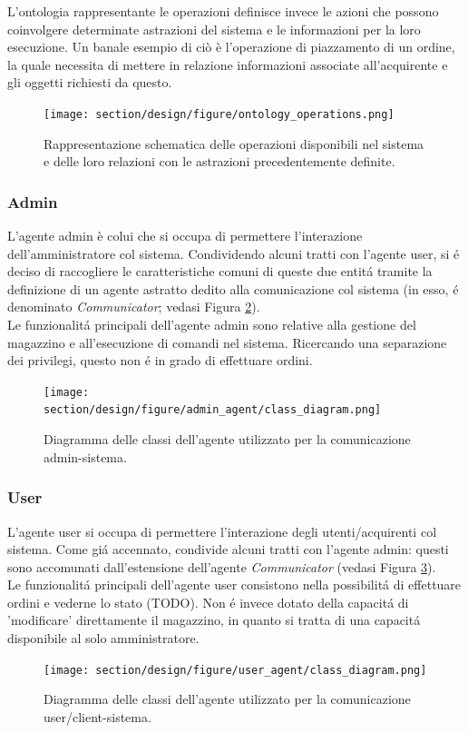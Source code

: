 %
\parag
L'ontologia rappresentante le operazioni definisce invece le azioni che possono coinvolgere determinate astrazioni del sistema e le informazioni per la loro esecuzione. Un banale esempio di ciò è l'operazione di piazzamento di un ordine, la quale necessita di mettere in relazione informazioni associate all'acquirente e gli oggetti richiesti da questo.
\begin{figure}[ht]
    \texttt{[image: section/design/figure/ontology\_operations.png]}%
    \caption{Rappresentazione schematica delle operazioni disponibili nel sistema e delle loro relazioni con le astrazioni precedentemente definite.}
    \label{fig:ontology_operations}
\end{figure}

\subsubsection{Admin}
L'agente admin \`e colui che si occupa di permettere l'interazione dell'amministratore col sistema. Condividendo alcuni tratti con l'agente user, si \'e deciso di raccogliere le caratteristiche comuni di queste due entit\'a tramite la definizione di un agente astratto dedito alla comunicazione col sistema (in esso, \'e denominato \textit{Communicator}; vedasi Figura \ref{fig:class_diagram_admin_agent}).\\
Le funzionalit\'a principali dell'agente admin sono relative alla gestione del magazzino e all'esecuzione di comandi nel sistema. Ricercando una separazione dei privilegi, questo non \'e in grado di effettuare ordini.
\begin{figure}[ht]
    \texttt{[image: section/design/figure/admin\_agent/class\_diagram.png]}
    \caption{Diagramma delle classi dell'agente utilizzato per la comunicazione admin-sistema.}
    \label{fig:class_diagram_admin_agent}
\end{figure}

\subsubsection{User}
L'agente user si occupa di permettere l'interazione degli utenti/acquirenti col sistema. Come gi\'a accennato, condivide alcuni tratti con l'agente admin: questi sono accomunati dall'estensione dell'agente \textit{Communicator} (vedasi Figura \ref{fig:class_diagram_user_agent}).\\
Le funzionalit\'a principali dell'agente user consistono nella possibilit\'a di effettuare ordini e vederne lo stato (TODO). Non \'e invece dotato della capacit\'a di 'modificare' direttamente il magazzino, in quanto si tratta di una capacit\'a disponibile al solo amministratore.
\begin{figure}[ht]
    \texttt{[image: section/design/figure/user\_agent/class\_diagram.png]}
    \caption{Diagramma delle classi dell'agente utilizzato per la comunicazione user/client-sistema.}
    \label{fig:class_diagram_user_agent}
\end{figure}

